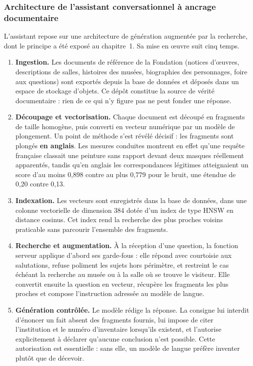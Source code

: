 \subsubsection{Architecture de l'assistant conversationnel à ancrage documentaire}

L'assistant repose sur une architecture de génération augmentée par la
recherche, dont le principe a été exposé au chapitre~1. Sa mise en œuvre suit
cinq temps.

\begin{enumerate}
  \item \textbf{Ingestion.} Les documents de référence de la Fondation (notices d'œuvres, descriptions de salles, histoires des musées,
        biographies des personnages, foire aux questions) sont exportés depuis
        la base de données et déposés dans un espace de stockage d'objets. Ce
        dépôt constitue la source de vérité documentaire : rien de ce qui n'y
        figure pas ne peut fonder une réponse.

  \item \textbf{Découpage et vectorisation.} Chaque document est découpé en
        fragments de taille homogène, puis converti en vecteur numérique par un
        modèle de plongement. Un point de méthode s'est révélé décisif : les
        fragments sont plongés \textbf{en anglais}. Les mesures conduites
        montrent en effet qu'une requête française classait une peinture sans
        rapport devant deux masques réellement apparentés, tandis qu'en anglais
        les correspondances légitimes atteignaient un score d'au moins 0,898
        contre au plus 0,779 pour le bruit, une étendue de 0,20 contre 0,13.

  \item \textbf{Indexation.} Les vecteurs sont enregistrés dans la base de
        données, dans une colonne vectorielle de dimension 384 dotée d'un index
        de type HNSW en distance cosinus. Cet index rend la recherche des plus
        proches voisins praticable sans parcourir l'ensemble des fragments.

  \item \textbf{Recherche et augmentation.} À la réception d'une question, la
        fonction serveur applique d'abord ses garde-fous : elle répond avec
        courtoisie aux salutations, refuse poliment les sujets hors périmètre,
        et restreint le cas échéant la recherche au musée ou à la salle où se
        trouve le visiteur. Elle convertit ensuite la question en vecteur,
        récupère les fragments les plus proches et compose l'instruction
        adressée au modèle de langue.

  \item \textbf{Génération contrôlée.} Le modèle rédige la réponse. La consigne
        lui interdit d'énoncer un fait absent des fragments fournis, lui impose
        de citer l'institution et le numéro d'inventaire lorsqu'ils existent, et
        l'autorise explicitement à déclarer qu'aucune conclusion n'est possible.
        Cette autorisation est essentielle : sans elle, un modèle de langue
        préfère inventer plutôt que de décevoir.
\end{enumerate}


